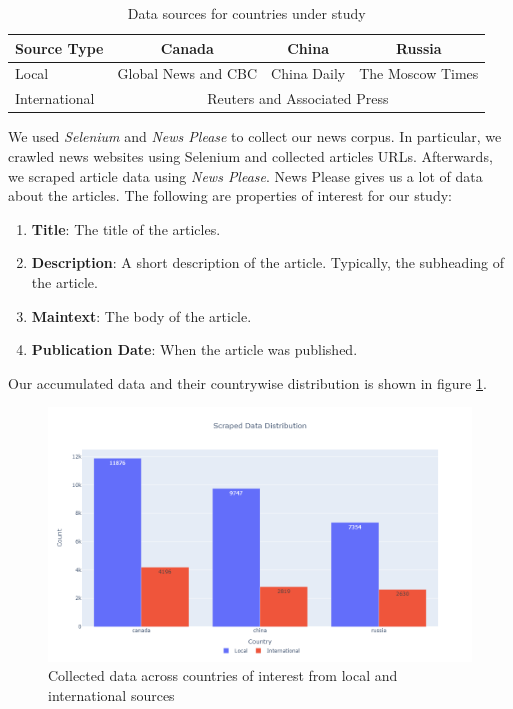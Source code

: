 \documentclass{article}
\theoremstyle{mytheoremstyle}
\theoremstyle{mytheoremstyle}
\theoremstyle{myproblemstyle}
\begin{document}
    \begin{table}[ph]
        \centering
        \begin{tabular}{|l|c|c|c|}
            \hline
            Source Type & Canada & China & Russia \\
            \hline
            Local & Global News and CBC & China Daily & The Moscow Times \\
            \hline
            International & \multicolumn{3}{c|}{Reuters and Associated Press} \\
            \hline
        \end{tabular}
        \caption{Data sources for countries under study}
        \label{table:data_sources}
    \end{table}

    We used \emph{Selenium} and \emph{News Please} to collect our news corpus. In particular, we crawled news websites using Selenium and collected articles URLs. Afterwards, we scraped article data using \emph{News Please}. News Please gives us a lot of data about the articles. \cite{Hamborg2017} The following are properties of interest for our study:

    \begin{enumerate}
        \item \textbf{Title}: The title of the articles.
        \item \textbf{Description}: A short description of the article. Typically, the subheading of the article.
        \item \textbf{Maintext}: The body of the article.
        \item \textbf{Publication Date}: When the article was published.
    \end{enumerate}

    Our accumulated data and their countrywise distribution is shown in figure \ref{fig:raw_data}.
    
    \begin{figure}[ht]
        \centering
        \includegraphics[width=\linewidth]{../images/plots/barchart_scraped_data.png}
        \caption{Collected data across countries of interest from local and international sources}
        \label{fig:raw_data}
    \end{figure}
\end{document}
